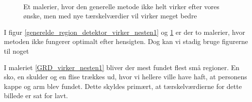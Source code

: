 \begin{figure}[!h]
    \centering
    \\
	\hspace{1em}
     \caption[]{Et malerier, hvor den generelle metode ikke helt virker efter vores ønske, men med nye tærskelværdier vil virker meget bedre}
     \label{generelde_region_detektor_virker_nesten2}
\end{figure}

I figur \ref{generelde_region_detektor_virker_nesten1} og \ref{generelde_region_detektor_virker_nesten2} er der to
malerier, hvor metoden ikke fungerer optimalt efter hensigten. Dog kan
vi stadig bruge figurerne til noget

I maleriet \ref{GRD_virker_nesten1} bliver der mest fundet flest små
regioner. En sko, en skulder og en flise trækkes ud, hvor vi hellere
ville have haft, at personens kappe og arm blev fundet. Dette skyldes
primært, at tærskelværdierne for dette billede er sat for lavt. 



